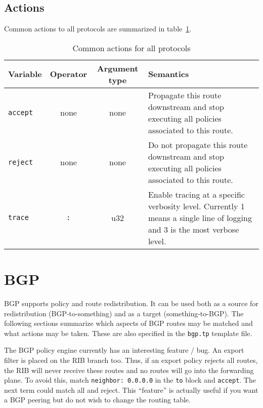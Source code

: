 \subsection{Actions}
Common actions to all protocols are summarized in
table~\ref{policy_common_action}.

\begin{table}[h]
\centering
\begin{tabular}{|l|c|c|p{9cm}|}
\hline
Variable & Operator & Argument type & Semantics \\
\hline\hline
{\tt accept} & none & none & Propagate this route downstream and stop executing
all policies associated to this route.\\
{\tt reject} & none & none & Do not propagate this route downstream and stop executing
all policies associated to this route.\\
\hline
{\tt trace} & {\tt :} & u32 & Enable tracing at a specific verbosity level.
Currently 1 means a single line of logging and 3 is the most verbose level. \\
\hline
\end{tabular}
\caption{\label{policy_common_action}Common actions for all protocols}
\end{table}

\section{BGP}
BGP supports policy and route redistribution.  It can be used both as a source
for redistribution (BGP-to-something) and as a target (something-to-BGP).  The
following sections summarize which aspects of BGP routes may be matched and what
actions may be taken. These are also specified in the {\tt bgp.tp} template file.

The BGP policy engine currently has an interesting feature / bug.  An export
filter is placed on the RIB branch too.  Thus, if an export policy rejects all
routes, the RIB will never receive these routes and no routes will go into the
forwarding plane.  To avoid this, match {\tt neighbor: 0.0.0.0} in the {\tt to}
block and {\tt accept}.  The next term could match all and reject.  This
``feature'' is actually useful if you want a BGP peering but do not wish to
change the routing table.

